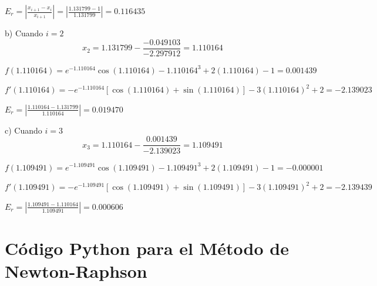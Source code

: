 \documentclass[12pt]{article}
\begin{document}
\begin{center}
$E_r=\left|\frac{x_{i+1}-x_i}{x_{i+1}}\right|=\left|\frac{1.131799-1}{1.131799}\right|=0.116435$

\vspace{0.5cm}

b) Cuando $i=2$
\[x_2=1.131799-\frac{-0.049103}{-2.297912}=1.110164\]

$f(1.110164)=e^{-1.110164}\cos(1.110164)-1.110164^3+2(1.110164)-1=0.001439$

$f'(1.110164)=-e^{-1.110164}[\cos(1.110164)+\sin(1.110164)]-3(1.110164)^2+2=-2.139023$

$E_r=\left|\frac{1.110164-1.131799}{1.110164}\right|=0.019470$

\vspace{0.5cm}

c) Cuando $i=3$
\[x_3=1.110164-\frac{0.001439}{-2.139023}=1.109491\]

$f(1.109491)=e^{-1.109491}\cos(1.109491)-1.109491^3+2(1.109491)-1=-0.000001$

$f'(1.109491)=-e^{-1.109491}[\cos(1.109491)+\sin(1.109491)]-3(1.109491)^2+2=-2.139439$

$E_r=\left|\frac{1.109491-1.110164}{1.109491}\right|=0.000606$

\begin{center}
\end{center}
\vspace{1cm}

\section*{Código Python para el Método de Newton-Raphson}


\end{center}
\end{document}
